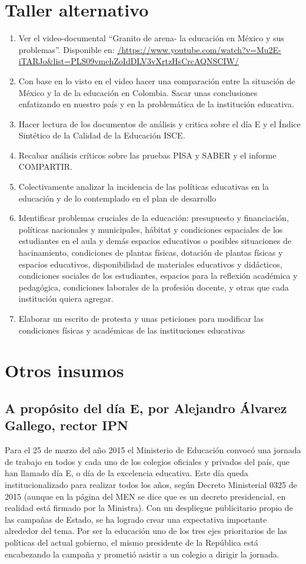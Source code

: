 \documentclass[10pt]{article}
\begin{document}
\section*{Taller alternativo}
\begin{enumerate}
\item Ver el video-documental “Granito de arena- la educación en México y sus problemas”. Disponible en: \url{/https://www.youtube.com/watch?v=Mu2E-iTARJo&list=PLS09vmehZoIdDLV3vXrtzHsCrcAQNSCIW/}
\item Con base en lo visto en el video hacer una comparación entre la situación de México y la de la educación en Colombia. Sacar unas conclusiones enfatizando en nuestro país y en la problemática de la institución educativa.
\item Hacer lectura de los documentos de análisis y critica sobre el día E y el Índice Sintético de la Calidad de la Educación ISCE.
\item Recabar análisis críticos sobre las pruebas PISA y SABER y el informe COMPARTIR.
\item Colectivamente analizar la incidencia de las políticas educativas en la educación y de lo contemplado en el plan de desarrollo
\item Identificar problemas cruciales de la educación: presupuesto y financiación, políticas nacionales y municipales, hábitat y condiciones espaciales de los estudiantes en el aula y demás espacios educativos o posibles situaciones de hacinamiento, condiciones de plantas físicas, dotación de plantas físicas y espacios educativos, disponibilidad de materiales educativos y didácticos, condiciones sociales de los estudiantes, espacios para la reflexión académica y pedagógica, condiciones laborales de la profesión docente, y otras que cada institución quiera agregar.
\item Elaborar un escrito de protesta y unas peticiones para modificar las condiciones físicas y académicas de las instituciones educativas
\end{enumerate}
\section*{Otros insumos}
\subsection*{A prop\'{o}sito del d\'{i}a E, por Alejandro \'{A}lvarez Gallego, rector IPN}
Para el 25 de marzo del año 2015 el Ministerio de Educación convocó una jornada de trabajo en todos y cada uno de los colegios oficiales y privados del país, que han llamado día E, o día de la excelencia educativa. Este día queda institucionalizado para realizar todos los años, según Decreto Ministerial 0325 de 2015 (aunque en la página del MEN se dice que es un decreto presidencial, en realidad está firmado por la Ministra). Con un despliegue publicitario propio de las campañas de Estado, se ha logrado crear una expectativa importante alrededor del tema. Por ser la educación uno de los tres ejes prioritarios de las políticas del actual gobierno, el mismo presidente de la República está encabezando la campaña y prometió asistir a un colegio a dirigir la jornada.
\end{document}
